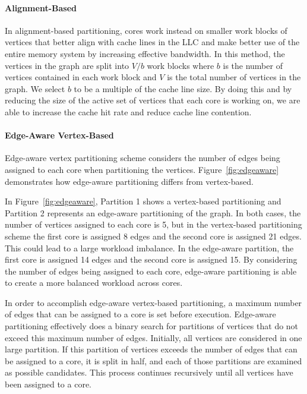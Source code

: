 \paragraph{Alignment-Based} 
In alignment-based partitioning, cores work instead on smaller work blocks of vertices that better align with cache lines in the LLC and make better use of the entire memory system by increasing effective bandwidth.
In this method, the vertices in the graph are split into $V/b$ work blocks where $b$ is the number of vertices contained in each work block and $V$ is the total number of vertices in the graph. We select $b$ to be a multiple of the cache line size. By doing this and by reducing the size of the active set of vertices that each core is working on, we are able to increase the cache hit rate and reduce cache line contention.


\paragraph{Edge-Aware Vertex-Based}
\edgeAwareMethodFigure
Edge-aware vertex partitioning scheme considers the number of edges being assigned to each core when partitioning the vertices.
Figure~\ref{fig:edgeaware} demonstrates how edge-aware partitioning differs from vertex-based.

In Figure~\ref{fig:edgeaware}, Partition 1 shows a vertex-based partitioning and Partition 2 represents an edge-aware partitioning of the graph.
In both cases, the number of vertices assigned to each core is 5, but in the vertex-based partitioning scheme the first core is assigned 8 edges and the second core is assigned 21 edges.
This could lead to a large workload imbalance.
In the edge-aware partition, the first core is assigned 14 edges and the second core is assigned 15.
By considering the number of edges being assigned to each core, edge-aware partitioning is able to create a more balanced workload across cores.


In order to accomplish edge-aware vertex-based partitioning, a maximum number of edges that can be assigned to a core is set before execution. 
Edge-aware partitioning effectively does a binary search for partitions of vertices that do not exceed this maximum number of edges. 
Initially, all vertices are considered in one large partition.
If this partition of vertices exceeds the number of edges that can be assigned to a core, it is split in half, and each of those partitions are examined as possible candidates.
This process continues recursively until all vertices have been assigned to a core.

